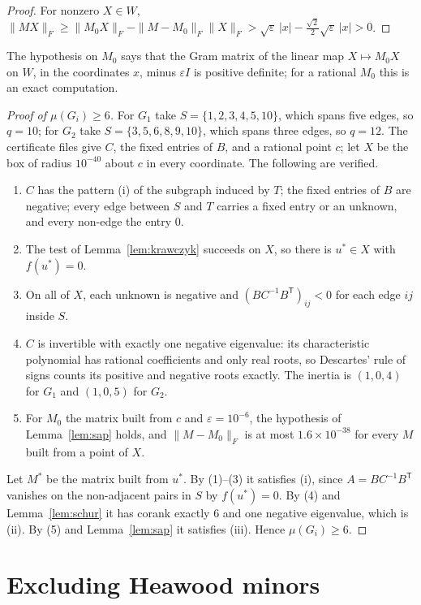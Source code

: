 \documentclass[11pt]{article}
\theoremstyle{remark}
\begin{document}
\begin{proof}
For nonzero $X\in W$,
$\|MX\|_F\ge\|M_0X\|_F-\|M-M_0\|_F\|X\|_F
>\sqrt\varepsilon\,|x|-\tfrac{\sqrt2}{2}\sqrt\varepsilon\,|x|>0$.
\end{proof}

The hypothesis on $M_0$ says that the Gram matrix of the linear map
$X\mapsto M_0X$ on $W$, in the coordinates $x$, minus $\varepsilon I$ is
positive definite; for a rational $M_0$ this is an exact computation.

\begin{proof}[Proof of $\mu(G_i)\ge6$]
For $G_1$ take $S=\{1,2,3,4,5,10\}$, which spans five edges, so $q=10$;
for $G_2$ take $S=\{3,5,6,8,9,10\}$, which spans three edges, so $q=12$.
The certificate files give $C$, the fixed entries of $B$, and a rational
point $c$; let $X$ be the box of radius $10^{-40}$ about $c$ in every
coordinate. The following are verified.
\begin{enumerate}
\item $C$ has the pattern (i) of the subgraph induced by $T$; the fixed
  entries of $B$ are negative; every edge between $S$ and $T$ carries a
  fixed entry or an unknown, and every non-edge the entry $0$.
\item The test of Lemma~\ref{lem:krawczyk} succeeds on $X$, so there is
  $u^*\in X$ with $f(u^*)=0$.
\item On all of $X$, each unknown is negative and $(BC^{-1}B^{\mathsf T})_{ij}<0$
  for each edge $ij$ inside $S$.
\item $C$ is invertible with exactly one negative eigenvalue: its
  characteristic polynomial has rational coefficients and only real roots,
  so Descartes' rule of signs counts its positive and negative roots
  exactly. The inertia is $(1,0,4)$ for $G_1$ and $(1,0,5)$ for $G_2$.
\item For $M_0$ the matrix built from $c$ and $\varepsilon=10^{-6}$, the
  hypothesis of Lemma~\ref{lem:sap} holds, and $\|M-M_0\|_F$ is at most
  $1.6\times10^{-38}$ for every $M$ built from a point of $X$.
\end{enumerate}
Let $M^*$ be the matrix built from $u^*$. By (1)--(3) it satisfies (i),
since $A=BC^{-1}B^{\mathsf T}$ vanishes on the non-adjacent pairs in $S$ by
$f(u^*)=0$. By (4) and Lemma~\ref{lem:schur} it has corank exactly $6$ and
one negative eigenvalue, which is (ii). By (5) and Lemma~\ref{lem:sap} it
satisfies (iii). Hence $\mu(G_i)\ge6$.
\end{proof}

\section{Excluding Heawood minors}\label{sec:minors}
\end{document}
